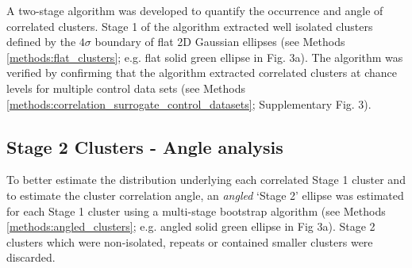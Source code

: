 \documentclass{article}
\begin{document}
A two-stage algorithm was developed to quantify the occurrence and angle of correlated clusters. Stage 1 of the algorithm extracted well isolated clusters defined by the $4\sigma$ boundary of flat 2D Gaussian ellipses (see Methods \ref{methods:flat_clusters}; e.g. flat solid green ellipse in Fig. 3a).
The algorithm was verified by confirming that the algorithm extracted correlated clusters at chance levels for multiple control data sets (see Methods \ref{methods:correlation_surrogate_control_datasets}; Supplementary Fig. 3). 








\subsection*{Stage 2 Clusters - Angle analysis}
\label{results:cluster_angle}

To better estimate the distribution underlying each correlated Stage 1 cluster and to estimate the cluster correlation angle, an \textit{angled} `Stage 2' ellipse was estimated for each Stage 1 cluster using a multi-stage bootstrap algorithm (see Methods \ref{methods:angled_clusters}; e.g. angled solid green ellipse in Fig 3a).
Stage 2 clusters which were non-isolated, repeats or contained smaller clusters were discarded. 
\end{document}
